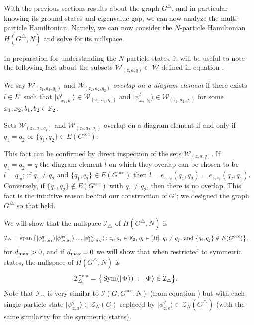 \documentclass[../thesis-main/thesis-main]{subfiles}
\begin{document}
With the previous sections results about the graph $G^{\triangle}$, and in particular knowing its ground states and eigenvalue gap, we can now analyze the multi-particle Hamiltonian.  Namely, we can now consider the $N$-particle Hamiltonian $H(G^{\triangle},N)$ and solve for its nullspace. 

In preparation for understanding the $N$-particle states, it will be useful to note the following fact about the subsets $\mathcal{W}_{(z,a,q)}\subset\mathcal{W}$ defined in equation .
\begin{definition}
\label{defn:overlap_diagram_element}
  We say $\mathcal{W}_{(z_{1},a_{1},q_{1})}$ and $\mathcal{W}_{(z_{2},a_{2},q_{2})}$ \emph{overlap on a diagram element} if there exists $l\in L^{\square}$ such that $|\psi_{x_{1},b_{1}}^{l}\rangle\in\mathcal{W}_{(z_{1},a_{1},q_{1})}$ and $|\psi_{x_{2},b_{2}}^{l}\rangle\in\mathcal{W}_{(z_{2},a_{2},q_{2})}$ for some $x_{1},x_{2},b_{1},b_{2}\in\mathbb{F}_2$.
\end{definition}

\begin{fact}
\label{fct:block_property}
Sets $\mathcal{W}_{(z_{1},a_{1},q_{1})}$ and $\mathcal{W}_{(z_{2},a_{2},q_{2})}$ overlap on a diagram element if and only if $q_{1}=q_{2}$ or $\{q_{1},q_{2}\}\in E(G^{\text{occ}})$.
\end{fact}
This fact can be confirmed by direct inspection of the sets $\mathcal{W}_{(z,a,q)}$. If $q_{1}=q_{2}=q$ the diagram element $l$ on which they overlap can be chosen to be $l=q_{\mathrm{in}}$; if $q_{1}\neq q_{2}$ and $\{q_{1},q_{2}\}\in E(G^{\text{occ}})$ then $l=e_{z_{1}z_{2}}(q_{1},q_{2})=e_{z_{2}z_{1}}(q_{2},q_{1})$.
Conversely, if $\{q_1,q_2\} \notin E(G^{\text{occ}})$ with $q_1 \ne q_2$, then there is no overlap.  This fact is the intuitive reason behind our construction of $G^\square$; we designed the graph $G^\triangle$ so that  held.

We will show that the nullspace $\mathcal{I}_{\triangle}$ of $H(G^{\triangle},N)$ is 
\begin{align}
  \mathcal{I}_{\triangle}&=\operatorname{span}\big\{|\phi_{z_{1},a_{1}}^{q_{1}}\rangle|\phi_{z_{2},a_{2}}^{q_{2}}\rangle\ldots|\phi_{z_{N},a_{N}}^{q_{N}}\rangle\colon
\text{$z_{i},a_{i}\in\mathbb{F}_2$, $q_{i}\in[R]$, $q_{i}\neq q_{j}$, and $\{q_{i},q_{j}\}\notin E(G^{\text{occ}})$}\big\},
\label{eq:I_triangle}
\end{align}
for $d_{\text{max}} > 0$, and if $d_{\text{max}} = 0$ we will show that when restricted to symmetric states, the nullspace of $H(G^{\triangle},N)$ is 
\begin{align}
  \mathcal{I}_{\triangle}^{\operatorname{Sym}} &=  \big\{ \operatorname{Sym} ( |\mspace{2mu} \Phi \mspace{2mu} \rangle) \; : \; |\mspace{2mu} \Phi \mspace{2mu} \rangle \in \mathcal{I}_{\triangle}\big\}.
\end{align}
Note that $\mathcal{I}_{\triangle}$ is very similar to $\mathcal{I}(G,G^{\text{occ}},N)$ (from equation ) but with each single-particle state $|\psi_{z,a}^{q}\rangle\in\mathcal{Z}_{N}(G)$ replaced by $|\phi_{z,a}^{q}\rangle\in\mathcal{Z}_{N}(G^{\triangle})$ (with the same similarity for the symmetric states).
\end{document}

